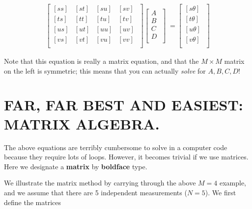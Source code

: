 \begin{eqnarray}
\label{smeqn} 
\left[ 
\begin{array}{cccc} 
{[ss]} & {[st]} & {[su]} & {[sv]} \\ 
{[ts]} & {[tt]} & {[tu]} & {[tv]} \\ 
{[us]} & {[ut]} & {[uu]} & {[uv]} \\ 
{[vs]} & {[vt]} & {[vu]} & {[vv]} \\
\end{array} 
\; \right] 
\left[ 
\begin{array}{c} 
A \\ 
B \\ 
C \\ 
D \\
\end{array} 
\; \right] 
\; = 
\left[ 
\begin{array}{c} 
{[s \theta]} \\ 
{[t \theta]} \\ 
{[u \theta]} \\ 
{[v \theta]} \\ 
\end{array} 
\; \right]
\end{eqnarray} 

\noindent Note that this equation is really a matrix equation, and that
the $M \times M$ matrix on the left is symmetric; this means that you can
actually {\it solve} for $A, B, C, D$! 

\section{FAR, FAR BEST AND EASIEST: MATRIX ALGEBRA.} 

	The above equations are terribly cumbersome to solve in a
computer code because they require lots of loops.  However, it becomes
trivial if we use matrices.  Here we designate a {\bf matrix} by {\bf
boldface} type. 

	We illustrate the matrix method by carrying through the above
$M=4$ example, and we assume that there are 5 independent measurements
($N=5$).  We first define the matrices


